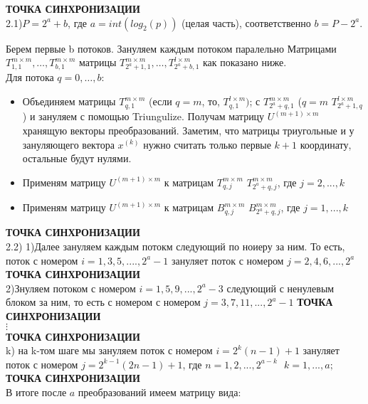 \documentclass[a4paper,12pt]{article}
\begin{document}
\textbf{ ТОЧКА СИНХРОНИЗАЦИИ} \\

2.1)$P = 2^{a} + b$, где $a = int(log_{2}(p))$ (целая часть), соответственно $b = P-2^a$.

Берем первые b потоков. Зануляем каждым потоком паралельно Матрицами $T_{1,1}^{m \times m}, \dots, T_{b,1}^{m \times m}$ матрицы $T_{2^{a} +1,1}^{m \times m}, \dots , T_{2^{a} +b,1}^{l \times m}$ как показано ниже.\\ 
Для потока $q = 0, \dots,b$: 
\begin{itemize}
    \item Объединяем матрицы $T_{q,1}^{m \times m}$ (если $q = m$, то, $T_{q,1}^{l \times m})$; с $T_{2^{a} +q,1}^{m \times m}$ ($q = m$ $T_{2^{a} +1,q}^{l \times m}$) и зануляем с помощью Triungulize. Получам матрицу $U^{(m+1) \times m}$ хранящую векторы преобразований. Заметим, что матрицы триугольные и у зануляющего вектора $x^{(k)}$ нужно считать только первые $k+1$ координату, остальные будут нулями.
    \item Применям матрицу $U^{(m+1) \times m}$ к матрицам  $T_{q,j}^{m \times m}$ $T_{2^{a} +q,j} ^{m \times m}$, где $j = 2,...,k$
    \item Применям матрицу $U^{(m+1) \times m}$ к матрицам  $B_{q,j}^{m \times m}$ $B_{2^{a} +q,j} ^{m \times m}$, где $j = 1,...,k$
\end{itemize}
\textbf{ ТОЧКА СИНХРОНИЗАЦИИ}\\
2.2) 1)Далее зануляем каждым потокм следующий по ноиеру за ним. То есть, поток с номером $i= 1,3,5,....,2^{a}-1$ зануляет поток с номером $j = 2,4,6,...,2^{a}$ 
\textbf{ТОЧКА СИНХРОНИЗАЦИИ}\\
2)Знуляем потоком с номером $i = 1,5,9,...,2^{a}-3$ следующий с ненулевым блоком за ним, то есть с номером с номером $j = 3,7,11,...,2^{a}-1$
\textbf{ТОЧКА СИНХРОНИЗАЦИИ}\\
$\vdots$\\
\textbf{ ТОЧКА СИНХРОНИЗАЦИИ}\\
k) на k-том шаге мы зануляем поток с номером $i = 2^{k}(n-1)+1$ зануляет поток с номером $j = 2^{k-1}(2n-1)+1$, где $n = 1,2,...,2^{a-k} \ \ \ k = 1,...,a;$
\textbf{ ТОЧКА СИНХРОНИЗАЦИИ}\\
В итоге после $a$ преобразований имеем матрицу вида:
\end{document}

